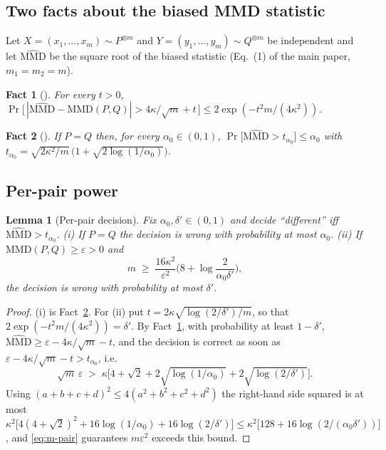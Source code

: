 \documentclass[10pt]{article}
\newtheorem{lemma}[theorem]{Lemma}
\newtheorem{fact}{Fact}[section]
\newcommand{\mmd}{\mathrm{MMD}}
\begin{document}
\subsection{Two facts about the biased MMD statistic}

Let $X=(x_1,\dots,x_m)\sim P^{\otimes m}$ and $Y=(y_1,\dots,y_m)\sim Q^{\otimes m}$
be independent and let $\widehat{\mmd}$ be the square root of the biased
statistic (Eq.~(1) of the main paper, $m_1=m_2=m$).

\begin{fact}[{\citealp[Thm.~7]{Gretton2012}}]
\label{fact:dev}
For every $t>0$,
$\Pr\big[\,|\widehat{\mmd}-\mmd(P,Q)|>4\kappa/\sqrt m+t\,\big]\le2\exp(-t^2m/(4\kappa^2))$.
\end{fact}

\begin{fact}[{\citealp[Cor.~9]{Gretton2012}}]
\label{fact:null}
If $P=Q$ then, for every $\alpha_0\in(0,1)$,
$\Pr\big[\widehat{\mmd}>t_{\alpha_0}\big]\le\alpha_0$ with
$t_{\alpha_0}=\sqrt{2\kappa^2/m}\,\big(1+\sqrt{2\log(1/\alpha_0)}\big)$.
\end{fact}

\subsection{Per-pair power}

\begin{lemma}[Per-pair decision]
\label{lem:pair}
Fix $\alpha_0,\delta'\in(0,1)$ and decide ``different'' iff
$\widehat{\mmd}>t_{\alpha_0}$.  (i) If $P=Q$ the decision is wrong with
probability at most $\alpha_0$.  (ii) If $\mmd(P,Q)\ge\varepsilon>0$ and
\begin{equation}
  m\;\ge\;\frac{16\kappa^2}{\varepsilon^2}\Big(8+\log\frac{2}{\alpha_0\delta'}\Big),
  \label{eq:m-pair}
\end{equation}
the decision is wrong with probability at most $\delta'$.
\end{lemma}

\begin{proof}
(i) is Fact~\ref{fact:null}.  For (ii) put $t=2\kappa\sqrt{\log(2/\delta')/m}$,
so that $2\exp(-t^2m/(4\kappa^2))=\delta'$.  By Fact~\ref{fact:dev}, with
probability at least $1-\delta'$,
$\widehat{\mmd}\ge\varepsilon-4\kappa/\sqrt m-t$, and the decision is correct
as soon as $\varepsilon-4\kappa/\sqrt m-t>t_{\alpha_0}$, i.e.
\[
  \sqrt m\,\varepsilon\;>\;\kappa\Big[4+\sqrt2+2\sqrt{\log(1/\alpha_0)}+2\sqrt{\log(2/\delta')}\Big].
\]
Using $(a+b+c+d)^2\le4(a^2+b^2+c^2+d^2)$ the right-hand side squared is at most
$\kappa^2\big[4(4+\sqrt2)^2+16\log(1/\alpha_0)+16\log(2/\delta')\big]
\le\kappa^2\big[128+16\log(2/(\alpha_0\delta'))\big]$, and \eqref{eq:m-pair}
guarantees $m\varepsilon^2$ exceeds this bound.
\end{proof}
\end{document}
